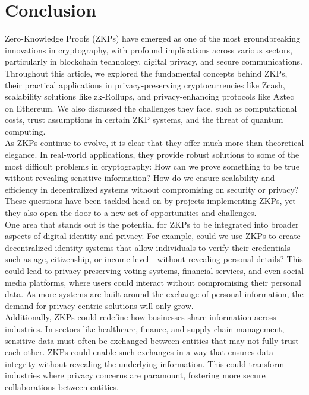 \section{Conclusion}
\justify
Zero-Knowledge Proofs (ZKPs) have emerged as one of the most groundbreaking innovations in cryptography, with profound implications across various sectors, particularly in blockchain technology, digital privacy, and secure communications. Throughout this article, we explored the fundamental concepts behind ZKPs, their practical applications in privacy-preserving cryptocurrencies like Zcash, scalability solutions like zk-Rollups, and privacy-enhancing protocols like Aztec on Ethereum. We also discussed the challenges they face, such as computational costs, trust assumptions in certain ZKP systems, and the threat of quantum computing.
\\
As ZKPs continue to evolve, it is clear that they offer much more than theoretical elegance. In real-world applications, they provide robust solutions to some of the most difficult problems in cryptography: How can we prove something to be true without revealing sensitive information? How do we ensure scalability and efficiency in decentralized systems without compromising on security or privacy? These questions have been tackled head-on by projects implementing ZKPs, yet they also open the door to a new set of opportunities and challenges.
\\
One area that stands out is the potential for ZKPs to be integrated into broader aspects of digital identity and privacy. For example, could we use ZKPs to create decentralized identity systems that allow individuals to verify their credentials—such as age, citizenship, or income level—without revealing personal details? This could lead to privacy-preserving voting systems, financial services, and even social media platforms, where users could interact without compromising their personal data. As more systems are built around the exchange of personal information, the demand for privacy-centric solutions will only grow.
\\
Additionally, ZKPs could redefine how businesses share information across industries. In sectors like healthcare, finance, and supply chain management, sensitive data must often be exchanged between entities that may not fully trust each other. ZKPs could enable such exchanges in a way that ensures data integrity without revealing the underlying information. This could transform industries where privacy concerns are paramount, fostering more secure collaborations between entities.
